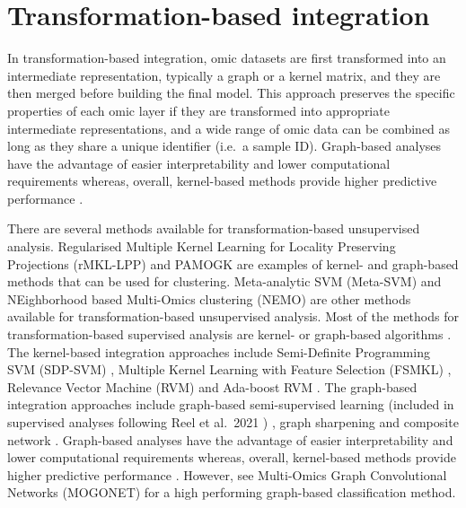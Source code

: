 \documentclass[
]{book}
\begin{document}
\hypertarget{multi-staged-omics-integration-transformation-based}{%
\section{Transformation-based integration}\label{multi-staged-omics-integration-transformation-based}}

In transformation-based integration, omic datasets are first transformed into an intermediate representation, typically a graph or a kernel matrix, and they are then merged before building the final model. This approach preserves the specific properties of each omic layer if they are transformed into appropriate intermediate representations, and a wide range of omic data can be combined as long as they share a unique identifier (i.e.~a sample ID). Graph-based analyses have the advantage of easier interpretability and lower computational requirements whereas, overall, kernel-based methods provide higher predictive performance \citep{Yan2017-xh}.

There are several methods available for transformation-based unsupervised analysis. Regularised Multiple Kernel Learning for Locality Preserving Projections (rMKL-LPP) \citep{Speicher2015-sv} and PAMOGK \citep{Tepeli2021-as} are examples of kernel- and graph-based methods that can be used for clustering. Meta-analytic SVM (Meta-SVM) \citep{Kim2017-ao} and NEighborhood based Multi-Omics clustering (NEMO) \citep{Rappoport2019-zn} are other methods available for transformation-based unsupervised analysis. Most of the methods for transformation-based supervised analysis are kernel- or graph-based algorithms \citep[\citet{Yan2017-xh}]{Reel2021-wb}. The kernel-based integration approaches include Semi-Definite Programming SVM (SDP-SVM) \citep{Lanckriet2004-kw}, Multiple Kernel Learning with Feature Selection (FSMKL) \citep{Seoane2014-as}, Relevance Vector Machine (RVM) \citep{Tipping2001-tj} and Ada-boost RVM \citep{Wu2010-jd}. The graph-based integration approaches include graph-based semi-supervised learning (included in supervised analyses following Reel et al.~2021 \citep{Reel2021-wb}) \citep{Kim2015-kx}, graph sharpening \citep{Shin2010-rj} and composite network \citep{Mostafavi2010-aa}. Graph-based analyses have the advantage of easier interpretability and lower computational requirements whereas, overall, kernel-based methods provide higher predictive performance \citep{Yan2017-xh}. However, see Multi-Omics Graph Convolutional Networks (MOGONET) \citep{Wang2021-wb} for a high performing graph-based classification method.
\end{document}
